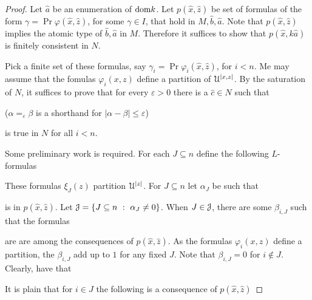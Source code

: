 \documentclass[10pt,oneside]{amsproc}
\begin{document}
{\begin{proof}
  Let $\hat a$ be an enumeration of ${\rm dom} k$.
  Let $p(\hat x,\hat z)$ be set of formulas of the form $\gamma=\Pr\varphi(\hat x,\hat z)$, for some $\gamma\in I$, that hold in $M,\hat b,\hat a$.
  Note that $p(\hat x,\hat z)$ implies the atomic type of $\hat b,\hat a$ in $M$.
  Therefore it suffices to show that $p(\hat x,k\hat a)$ is finitely consistent in $N$.

  Pick a finite set of these formulas, say $\gamma_i=\Pr\varphi_i(\hat x,\hat z)$, for $i<n$.
  Me may assume that the fomulas $\varphi_i(x,z)$ define a partition of ${\EuScript U}^{|x,z|}$.
  By the saturation of $N$, it suffices to prove that for every $\varepsilon>0$ there is a $\hat c\in N$ such that
  
  \hfill ($\alpha=_\varepsilon\beta$ is a shorthand for $|\alpha-\beta|\le\varepsilon$)
  
  is true in $N$ for all $i<n$.
  
  Some preliminary work is required.
  For each $J\subseteq n$ define the following $L$-formulas


  These formulas $\xi_J(z)$ partition ${\EuScript U}^{|z|}$.
  For $J\subseteq n$ let $\alpha_J$ be such that 
  
  
  is in $p(\hat x,\hat z)$.
  Let ${\EuScript J}=\{J\subseteq n\ :\ \alpha_J\neq0\}$. 
  When $J\in{\EuScript J}$, there are some $\beta_{i,J}$ such that the formulas


  are are among the consequences of $p(\hat x,\hat z)$.
  As the formulas $\varphi_i(x,z)$ define a partition, the $\beta_{i,J}$ add up to $1$ for any fixed $J$.
  Note that $\beta_{i,J}=0$ for $i\notin J$.
  Clearly, have that 


  It is plain that for $i\in J$ the following is a consequence of $p(\hat x,\hat z)$



\end{proof}}
\end{document}
